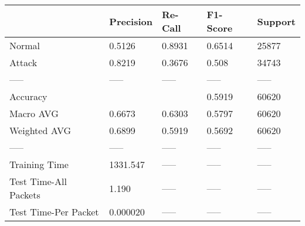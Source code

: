 \begin{tabular}{lllll}
\toprule
{} & Precision & Re-Call & F1-Score & Support \\
\midrule
Normal                &    0.5126 &  0.8931 &   0.6514 &   25877 \\
Attack                &    0.8219 &  0.3676 &    0.508 &   34743 \\
-----                 &     ----- &   ----- &    ----- &   ----- \\
Accuracy              &           &         &   0.5919 &   60620 \\
Macro AVG             &    0.6673 &  0.6303 &   0.5797 &   60620 \\
Weighted AVG          &    0.6899 &  0.5919 &   0.5692 &   60620 \\
-----                 &     ----- &   ----- &    ----- &   ----- \\
Training Time         &  1331.547 &   ----- &    ----- &   ----- \\
Test Time-All Packets &     1.190 &   ----- &    ----- &   ----- \\
Test Time-Per Packet  &  0.000020 &   ----- &    ----- &   ----- \\
\bottomrule
\end{tabular}
